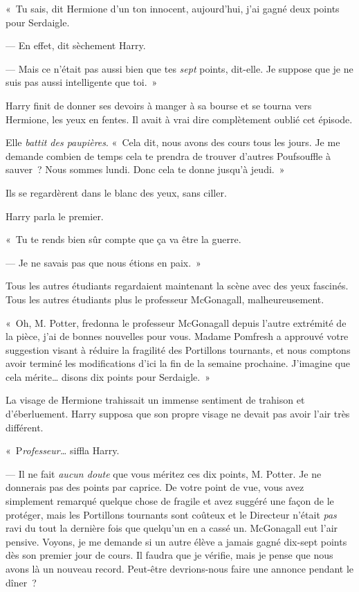 «~Tu sais, dit Hermione d'un ton innocent, aujourd'hui, j'ai gagné deux points pour Serdaigle.

--- En effet, dit sèchement Harry.

--- Mais ce n'était pas aussi bien que tes \emph{sept} points, dit-elle. Je suppose que je ne suis pas aussi intelligente que toi.~»

Harry finit de donner ses devoirs à manger à sa bourse et se tourna vers Hermione, les yeux en fentes. Il avait à vrai dire complètement oublié cet épisode.

Elle \emph{battit des paupières}. «~Cela dit, nous avons des cours tous les jours. Je me demande combien de temps cela te prendra de trouver d'autres Poufsouffle à sauver~? Nous sommes lundi. Donc cela te donne jusqu'à jeudi.~»

Ils se regardèrent dans le blanc des yeux, sans ciller.

Harry parla le premier.

«~Tu te rends bien sûr compte que ça va être la guerre.

--- Je ne savais pas que nous étions en paix.~»

Tous les autres étudiants regardaient maintenant la scène avec des yeux fascinés. Tous les autres étudiants plus le professeur McGonagall, malheureusement.

«~Oh, M. Potter, fredonna le professeur McGonagall depuis l'autre extrémité de la pièce, j'ai de bonnes nouvelles pour vous. Madame Pomfresh a approuvé votre suggestion visant à réduire la fragilité des Portillons tournants, et nous comptons avoir terminé les modifications d'ici la fin de la semaine prochaine. J'imagine que cela mérite… disons dix points pour Serdaigle.~»

La visage de Hermione trahissait un immense sentiment de trahison et d'éberluement. Harry supposa que son propre visage ne devait pas avoir l'air très différent.

«~P\emph{rofesseur…} siffla Harry.

--- Il ne fait \emph{aucun doute} que vous méritez ces dix points, M. Potter. Je ne donnerais pas des points par caprice. De votre point de vue, vous avez simplement remarqué quelque chose de fragile et avez suggéré une façon de le protéger, mais les Portillons tournants sont coûteux et le Directeur n'était \emph{pas} ravi du tout la dernière fois que quelqu'un en a cassé un. McGonagall eut l'air pensive. Voyons, je me demande si un autre élève a jamais gagné dix-sept points dès son premier jour de cours. Il faudra que je vérifie, mais je pense que nous avons là un nouveau record. Peut-être devrions-nous faire une annonce pendant le dîner~?

